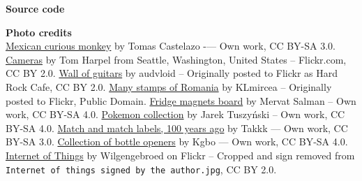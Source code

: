 \begin{frame}[t,plain,fragile=singleslide]
\begin{adjustwidth}{15mm}{15mm}
    \textbf{Source code} \\
    \vspace{2mm}

    \textbf{Photo credits} \\
    \href{https://commons.wikimedia.org/w/index.php?curid=12885513}{Mexican
      curious monkey} by Tomas Castelazo -— Own work, CC BY-SA 3.0. %
    \href{https://commons.wikimedia.org/w/index.php?curid=341924}{Cameras}
    by Tom Harpel from Seattle, Washington, United States --
    Flickr.com, CC BY 2.0. %
    \href{https://commons.wikimedia.org/w/index.php?curid=8775841}{Wall
      of guitars} by audvloid -- Originally posted to Flickr as Hard
    Rock Cafe, CC BY 2.0. %
    \href{https://commons.wikimedia.org/w/index.php?curid=8453746}{Many
      stamps of Romania} by KLmircea -- Originally posted to Flickr,
    Public Domain. %
    \href{https://commons.wikimedia.org/w/index.php?curid=53410895}{Fridge
      magnets board} by Mervat Salman -- Own work, CC BY-SA 4.0. %
    \href{https://commons.wikimedia.org/w/index.php?curid=41239841}{Pokemon
      collection} by Jarek Tuszyński -- Own work, CC BY-SA 4.0. %
    \href{https://commons.wikimedia.org/w/index.php?curid=10076345}{Match
      and match labels, 100 years ago} by Takkk — Own work, CC BY-SA
    3.0. %
    \href{https://commons.wikimedia.org/w/index.php?curid=51338181}{Collection
      of bottle openers} by Kgbo — Own work, CC BY-SA 4.0. %
    \href{https://commons.wikimedia.org/w/index.php?curid=32745645}{Internet
      of Things} by Wilgengebroed on Flickr -- Cropped and sign
    removed from \texttt{Internet of things signed by the author.jpg},
    CC BY 2.0.
  \end{adjustwidth}
\end{frame}

